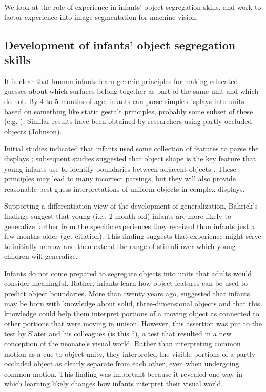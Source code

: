 We look at the role of experience in infants' object 
segregation skills, and work to factor experience into 
image segmentation for machine vision.


\subsection{Development of infants' object segregation skills}

It is clear that human infants learn generic principles for making
educated guesses about which surfaces belong together as part of the
same unit and which do not.  By 4 to 5 months of age, infants can
parse simple displays into units based on something like static
gestalt principles, probably some subset of these (e.g. ). 
%
Similar results have been obtained by researchers using partly
occluded objects (Johnson).

Initial studies indicated that infants used some collection of
features to parse the displays \cite{needham98infants,needham97object,needham98effects}; subsequent studies suggested that object shape is the key
feature that young infants use to identify boundaries between adjacent
objects \cite{needham99role}.
%
These principles may lead to many incorrect parsings, but they will
also provide reasonable best guess interpretations of uniform objects
in complex displays.  


Supporting a differentiation view of the development of
generalization, Bahrick's findings suggest that young (i.e.,
2-month-old) infants are more likely to generalize farther from the
specific experiences they received than infants just a few months
older (get citation).  This finding suggests that experience might
serve to initially narrow and then extend the range of stimuli over
which young children will generalize.


Infants do not come prepared to segregate objects into units that
adults would consider meaningful.  Rather, infants learn how object
features can be used to predict object boundaries.  More than twenty
years ago,  suggested that infants may be born
with knowledge about solid, three-dimensional objects and that this
knowledge could help them interpret portions of a moving object as
connected to other portions that were moving in unison.  However, this
assertion was put to the test by Slater and his colleagues (is this
?), a test that resulted in a new conception of
the neonate's visual world.  Rather than interpreting common motion as
a cue to object unity, they interpreted the visible portions of a
partly occluded object as clearly separate from each other, even when
undergoing common motion.  This finding was important because it
revealed one way in which learning likely changes how infants
interpret their visual world.


